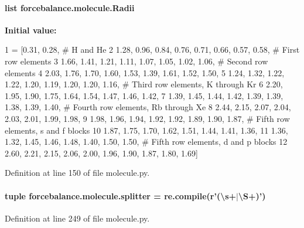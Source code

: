 \hypertarget{namespaceforcebalance_1_1molecule_a74f55a89a14ca676b5a06441d1fdab19}{
\paragraph[{Radii}]{\setlength{\rightskip}{0pt plus 5cm}list forcebalance.\-molecule.\-Radii}}\label{namespaceforcebalance_1_1molecule_a74f55a89a14ca676b5a06441d1fdab19}
{\bfseries Initial value\-:}
\begin{DoxyCode}
1 = [0.31, 0.28, \textcolor{comment}{# H and He}
2          1.28, 0.96, 0.84, 0.76, 0.71, 0.66, 0.57, 0.58, \textcolor{comment}{# First row elements}
3          1.66, 1.41, 1.21, 1.11, 1.07, 1.05, 1.02, 1.06, \textcolor{comment}{# Second row elements}
4          2.03, 1.76, 1.70, 1.60, 1.53, 1.39, 1.61, 1.52, 1.50, 
5          1.24, 1.32, 1.22, 1.22, 1.20, 1.19, 1.20, 1.20, 1.16, \textcolor{comment}{# Third row elements, K through Kr}
6          2.20, 1.95, 1.90, 1.75, 1.64, 1.54, 1.47, 1.46, 1.42, 
7          1.39, 1.45, 1.44, 1.42, 1.39, 1.39, 1.38, 1.39, 1.40, \textcolor{comment}{# Fourth row elements, Rb through Xe}
8          2.44, 2.15, 2.07, 2.04, 2.03, 2.01, 1.99, 1.98, 
9          1.98, 1.96, 1.94, 1.92, 1.92, 1.89, 1.90, 1.87, \textcolor{comment}{# Fifth row elements, s and f blocks}
10          1.87, 1.75, 1.70, 1.62, 1.51, 1.44, 1.41, 1.36, 
11          1.36, 1.32, 1.45, 1.46, 1.48, 1.40, 1.50, 1.50, \textcolor{comment}{# Fifth row elements, d and p blocks}
12          2.60, 2.21, 2.15, 2.06, 2.00, 1.96, 1.90, 1.87, 1.80, 1.69]
\end{DoxyCode}


Definition at line 150 of file molecule.\-py.

\hypertarget{namespaceforcebalance_1_1molecule_a09d04113accea9c88b084051c5de29d1}{
\paragraph[{splitter}]{\setlength{\rightskip}{0pt plus 5cm}tuple forcebalance.\-molecule.\-splitter = re.\-compile(r'(\textbackslash{}s+$|$\textbackslash{}S+)')}}\label{namespaceforcebalance_1_1molecule_a09d04113accea9c88b084051c5de29d1}


Definition at line 249 of file molecule.\-py.

